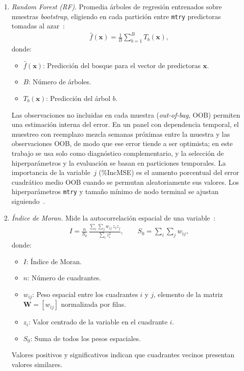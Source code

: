 \begin{enumerate}
    \item \textit{Random Forest (RF).} Promedia árboles de regresión entrenados sobre muestras \emph{bootstrap}, eligiendo en cada partición entre \texttt{mtry} predictoras tomadas al azar~\cite{ref19}:
    \begin{equation}
        \begin{aligned}
        \hat{f}(\mathbf{x}) = \frac{1}{B}\sum_{b=1}^{B} T_b(\mathbf{x}),
        \end{aligned}
        \label{eq:random_forest}
    \end{equation}
    donde:
    \begin{itemize}
        \item $\hat{f}(\mathbf{x})$: Predicción del bosque para el vector de predictoras $\mathbf{x}$.
        \item $B$: Número de árboles.
        \item $T_b(\mathbf{x})$: Predicción del árbol $b$.
    \end{itemize}
    Las observaciones no incluidas en cada muestra (\emph{out-of-bag}, OOB) permiten una estimación interna del error. En un panel con dependencia temporal, el muestreo con reemplazo mezcla semanas próximas entre la muestra y las observaciones OOB, de modo que ese error tiende a ser optimista; en este trabajo se usa solo como diagnóstico complementario, y la selección de hiperparámetros y la evaluación se basan en particiones temporales. La importancia de la variable~$j$ (\%IncMSE) es el aumento porcentual del error cuadrático medio OOB cuando se permutan aleatoriamente sus valores. Los hiperparámetros \texttt{mtry} y tamaño mínimo de nodo terminal se ajustan siguiendo~\cite{probst2019}.

    \item \textit{Índice de Moran.} Mide la autocorrelación espacial de una variable~\cite{moran1950}:
    \begin{equation}
        \begin{aligned}
        I = \frac{n}{S_0}\,\frac{\sum_{i}\sum_{j} w_{ij}\, z_i z_j}{\sum_{i} z_i^{2}}, \qquad S_0 = \sum_{i}\sum_{j} w_{ij},
        \end{aligned}
        \label{eq:moran}
    \end{equation}
    donde:
    \begin{itemize}
        \item $I$: Índice de Moran.
        \item $n$: Número de cuadrantes.
        \item $w_{ij}$: Peso espacial entre los cuadrantes $i$ y $j$, elemento de la matriz $\mathbf{W}=[w_{ij}]$ normalizada por filas.
        \item $z_i$: Valor centrado de la variable en el cuadrante $i$.
        \item $S_0$: Suma de todos los pesos espaciales.
    \end{itemize}
    Valores positivos y significativos indican que cuadrantes vecinos presentan valores similares.


\end{enumerate}
